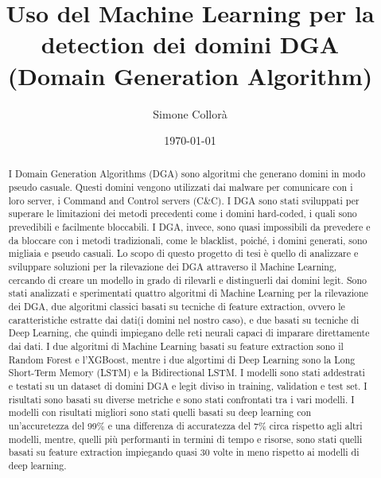 \documentclass[12pt,a4paper,openright,twoside]{book}
\title{Uso del Machine Learning per la detection dei domini DGA \break (Domain Generation Algorithm)}
\author{Simone Collorà}
\date{\today}
\begin{document}
\frontmatter\frontispiece
\nocite{*}

\begin{abstract}	
I Domain Generation Algorithms (DGA) sono algoritmi che generano domini in modo pseudo casuale.
Questi domini vengono utilizzati dai malware per comunicare con i loro server,
i Command and Control servers (C\&C).
I DGA sono stati sviluppati per superare le limitazioni
dei metodi precedenti come i domini hard-coded, i quali
sono prevedibili e facilmente bloccabili.
I DGA, invece, sono quasi impossibili da prevedere e da bloccare con i metodi tradizionali,
come le blacklist,
poiché, i domini generati, sono migliaia e pseudo casuali.
Lo scopo di questo progetto di tesi è quello di analizzare
e sviluppare soluzioni per la rilevazione dei DGA attraverso il Machine Learning, cercando
di creare un modello in grado di rilevarli e distinguerli
dai domini legit.
Sono stati analizzati e sperimentati quattro algoritmi di Machine Learning
per la rilevazione dei DGA, due algoritmi classici 
basati su tecniche di feature extraction, ovvero le caratteristiche estratte dai dati(i domini nel nostro caso),
e due basati su tecniche di Deep Learning, che quindi impiegano delle
reti neurali capaci di imparare direttamente dai dati.
I due algoritmi di Machine Learning basati su feature extraction
sono il Random Forest e l'XGBoost, mentre i due algortimi
di Deep Learning sono la Long Short-Term Memory (LSTM) e la Bidirectional LSTM.
I modelli sono stati addestrati e testati su un dataset di domini
DGA e legit diviso in training, validation e test set.
I risultati sono basati su diverse metriche e
sono stati confrontati tra i vari modelli.
I modelli con risultati migliori sono stati
quelli basati su deep learning con un'accuretezza del 99\% e una differenza di accuratezza del 7\%
circa rispetto agli altri modelli,
mentre, quelli più performanti in termini di tempo e risorse,
sono stati quelli basati su feature extraction
impiegando quasi 30 volte in meno rispetto ai modelli di deep learning.
\end{abstract}



\tableofcontents   
\listoffigures     %

\mainmatter

\end{document}
